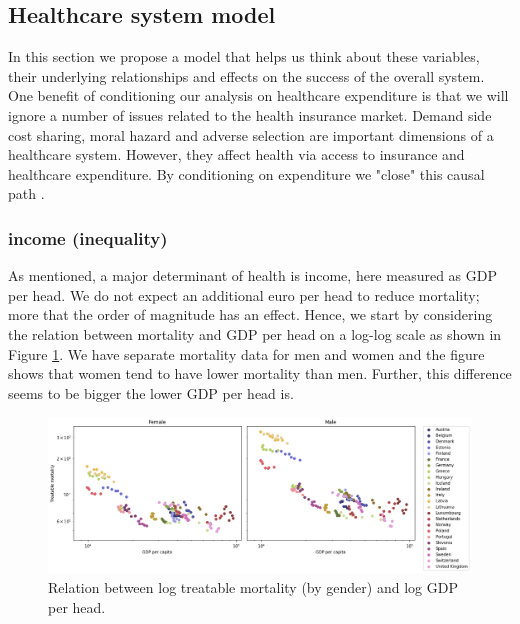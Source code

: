 \documentclass{article}
\begin{document}
\subsection{Healthcare system model}
\label{sec:org6ecf6c0}

In this section we propose a model that helps us think about these variables, their underlying relationships and effects on the success of the overall system. One benefit of conditioning our analysis on healthcare expenditure is that we will ignore a number of issues related to the health insurance market. Demand side cost sharing, moral hazard and adverse selection are important dimensions of a healthcare system. However, they affect health via access to insurance and healthcare expenditure. By conditioning on expenditure we "close" this causal path \citep{Causality2009}.

\subsubsection{income (inequality)}
\label{sec:org49c43ee}

As mentioned, a major determinant of health is income, here measured as GDP per head. We do not expect an additional euro per head to reduce mortality; more that the order of magnitude has an effect. Hence, we start by considering the relation between mortality and GDP per head on a log-log scale as shown in Figure \ref{fig:org5829a41}. We have separate mortality data for men and women and the figure shows that women tend to have lower mortality than men. Further, this difference seems to be bigger the lower GDP per head is.

\begin{figure}[htbp]
\centering
\includegraphics[width=.9\linewidth]{./figures/gdp_mortality_log_log_scale_by_sex.png}
\caption{\label{fig:org5829a41}Relation between log treatable mortality (by gender) and log GDP per head.}
\end{figure}
\end{document}
